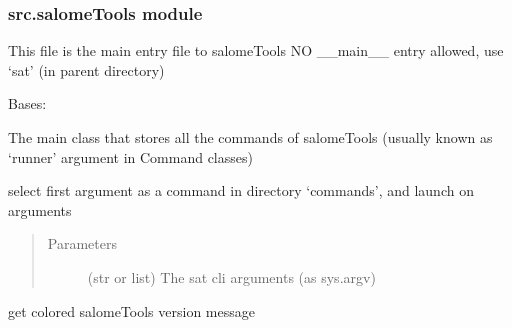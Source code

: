 \documentclass[a4paper,10pt,english]{sphinxmanual}
\begin{document}
\subsubsection{src.salomeTools module}
\label{\detokenize{apidoc_src/src:src-salometools-module}}\label{\detokenize{apidoc_src/src:module-src.salomeTools}}
This file is the main entry file to salomeTools
NO \_\_main\_\_ entry allowed, use ‘sat’ (in parent directory)

\begin{fulllineitems}
\label{\detokenize{apidoc_src/src:src.salomeTools.Sat}}
Bases: 

The main class that stores all the commands of salomeTools
(usually known as ‘runner’ argument in Command classes)

\begin{fulllineitems}
\label{\detokenize{apidoc_src/src:src.salomeTools.Sat.assumeAsList}}
\end{fulllineitems}


\begin{fulllineitems}
\label{\detokenize{apidoc_src/src:src.salomeTools.Sat.execute_cli}}
select first argument as a command in directory ‘commands’, and launch on arguments
\begin{quote}\begin{description}
\item[{Parameters}] \leavevmode
{} \textendash{} (str or list) The sat cli arguments (as sys.argv)

\end{description}\end{quote}

\end{fulllineitems}


\begin{fulllineitems}
\label{\detokenize{apidoc_src/src:src.salomeTools.Sat.getColoredVersion}}
get colored salomeTools version message


\end{fulllineitems}
\end{fulllineitems}
\end{document}
